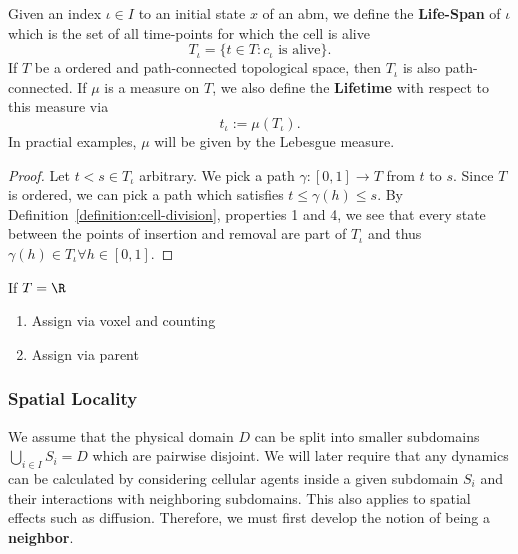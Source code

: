 \begin{lemma}
    \label{thm:cellular-uniqueness}
    Given an index $\iota\in I$ to an initial state $x$ of an \ac{abm}, we define the
    \textbf{Life-Span} of $\iota$ which is the set of all time-points for which the cell is alive
    \begin{equation}
        T_\iota=\{t\in T: c_\iota \text{ is alive}\}.
    \end{equation}
    If $T$ be a ordered and path-connected topological space, then $T_\iota$ is also path-connected.
    If $\mu$ is a measure on $T$, we also define the \textbf{Lifetime} with respect to this measure
    via
    \begin{equation}
        t_\iota:=\mu\left(T_\iota\right).
    \end{equation}
    In practial examples, $\mu$ will be given by the Lebesgue measure.
\end{lemma}
\begin{proof}
    Let $t<s\in T_\iota$ arbitrary.
    We pick a path $\gamma:[0,1]\rightarrow T$ from $t$ to $s$.
    Since $T$ is ordered, we can pick a path which satisfies $t\leq\gamma(h)\leq s$.
    By Definition~\ref{definition:cell-division}, properties 1 and 4, we see that every state
    between the points of insertion and removal are part of $T_\iota$ and thus
    $\gamma(h)\in T_\iota\forall h\in [0,1]$.
\end{proof}

\begin{corollary}
    If $T=\R$
\end{corollary}

\begin{enumerate}
    \item Assign via voxel and counting
    \item Assign via parent
\end{enumerate}

\subsubsection{Spatial Locality}
We assume that the physical domain $D$ can be split into smaller subdomains
$\bigcup_{i\in I}S_i=D$ which are pairwise disjoint.
We will later require that any dynamics can be calculated by considering cellular agents inside a
given subdomain $S_i$ and their interactions with neighboring subdomains.
This also applies to spatial effects such as diffusion.
Therefore, we must first develop the notion of being a \textbf{neighbor}.

